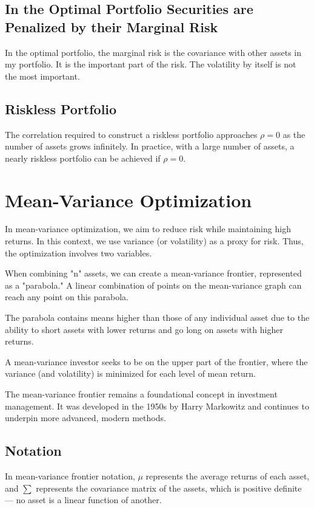 \documentclass{article}
\begin{document}
\subsection{In the Optimal Portfolio Securities are Penalized by their Marginal Risk}
In the optimal portfolio, the marginal risk is the covariance with other assets in my portfolio. It is the important part of the risk. The volatility by itself is not the most important.

\subsection{Riskless Portfolio}
The correlation required to construct a riskless portfolio approaches ${\rho}=0$ as the number of assets grows infinitely. In practice, with a large number of assets, a nearly riskless portfolio can be achieved if ${\rho}=0$.

\section{Mean-Variance Optimization}
In mean-variance optimization, we aim to reduce risk while maintaining high returns. In this context, we use variance (or volatility) as a proxy for risk. Thus, the optimization involves two variables.

When combining "n" assets, we can create a mean-variance frontier, represented as a "parabola."
A linear combination of points on the mean-variance graph can reach any point on this parabola.

The parabola contains means higher than those of any individual asset due to the ability to short assets with lower returns and go long on assets with higher returns.

A mean-variance investor seeks to be on the upper part of the frontier, where the variance (and volatility) is minimized for each level of mean return.

The mean-variance frontier remains a foundational concept in investment management. It was developed in the 1950s by Harry Markowitz and continues to underpin more advanced, modern methods.

\subsection{Notation}
In mean-variance frontier notation, ${\mu}$ represents the average returns of each asset, and ${\sum}$ represents the covariance matrix of the assets, which is positive definite — no asset is a linear function of another.
\end{document}
